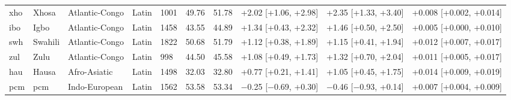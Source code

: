 {\begin{longtable}{@{}lllllrrlll@{}}
xho & Xhosa & Atlantic-Congo & Latin & 1001 & 49.76 & 51.78 & +2.02 [+1.06, +2.98] & +2.35 [+1.33, +3.40] & +0.008 [+0.002, +0.014] \\
ibo & Igbo & Atlantic-Congo & Latin & 1458 & 43.55 & 44.89 & +1.34 [+0.43, +2.32] & +1.46 [+0.50, +2.50] & +0.005 [+0.000, +0.010] \\
swh & Swahili & Atlantic-Congo & Latin & 1822 & 50.68 & 51.79 & +1.12 [+0.38, +1.89] & +1.15 [+0.41, +1.94] & +0.012 [+0.007, +0.017] \\
zul & Zulu & Atlantic-Congo & Latin & 998 & 44.50 & 45.58 & +1.08 [+0.49, +1.73] & +1.32 [+0.70, +2.04] & +0.011 [+0.005, +0.017] \\
hau & Hausa & Afro-Asiatic & Latin & 1498 & 32.03 & 32.80 & +0.77 [+0.21, +1.41] & +1.05 [+0.45, +1.75] & +0.014 [+0.009, +0.019] \\
pcm & pcm & Indo-European & Latin & 1562 & 53.58 & 53.34 & $-$0.25 [$-$0.69, +0.30] & $-$0.46 [$-$0.93, +0.14] & +0.007 [+0.004, +0.009] \\
\end{longtable}}
